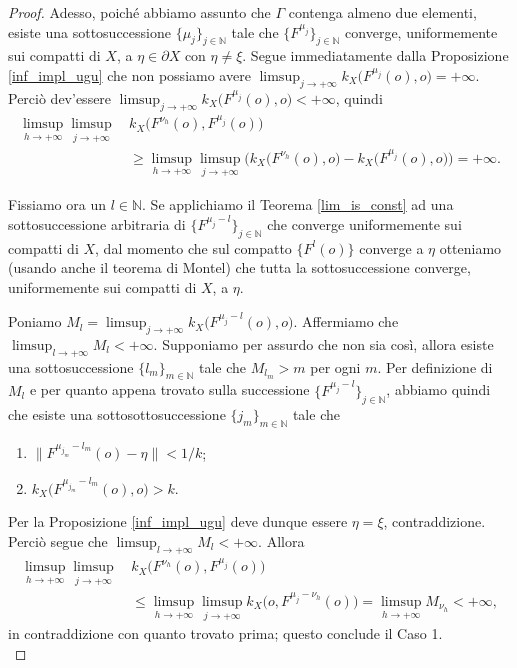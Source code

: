 \begin{proof}
    Adesso, poiché abbiamo assunto che $\Gamma$ contenga almeno due elementi, esiste una sottosuccessione $\{\mu_j\}_{j\in\mathbb{N}}$ tale che $\{F^{\mu_j}\}_{j\in\mathbb{N}}$ converge, uniformemente sui compatti di $X$, a $\eta\in\partial X$ con $\eta\not=\xi$. Segue immediatamente dalla Proposizione \ref{inf_impl_ugu} che non possiamo avere $\displaystyle\limsup_{j\longrightarrow+\infty} k_X\big(F^{\mu_j}(o),o\big)=+\infty$. Perciò dev'essere $\displaystyle\limsup_{j\longrightarrow+\infty} k_X\big(F^{\mu_j}(o),o\big)<+\infty$, quindi
    \begin{align*}
        \limsup_{h\longrightarrow+\infty}\limsup_{j\longrightarrow+\infty}\, &k_X\big(F^{\nu_h}(o),F^{\mu_j}(o)\big) \\
        &\ge \limsup_{h\longrightarrow+\infty}\limsup_{j\longrightarrow+\infty} \Big(k_X\big(F^{\nu_h}(o),o\big)-k_X\big(F^{\mu_j}(o),o\big)\Big)=+\infty.
    \end{align*}

    Fissiamo ora un $l\in\mathbb{N}$. Se applichiamo il Teorema \ref{lim_is_const} ad una sottosuccessione arbitraria di $\{F^{\mu_j-l}\}_{j\in\mathbb{N}}$ che converge uniformemente sui compatti di $X$, dal momento che sul compatto $\{F^l(o)\}$ converge a $\eta$ otteniamo (usando anche il teorema di Montel) che tutta la sottosuccessione converge, uniformemente sui compatti di $X$, a $\eta$.

    Poniamo $M_l=\displaystyle\limsup_{j\longrightarrow+\infty}k_X\big(F^{\mu_j-l}(o),o\big)$. Affermiamo che $\displaystyle\limsup_{l\longrightarrow+\infty}M_l<+\infty$. Supponiamo per assurdo che non sia così, allora esiste una sottosuccessione $\{l_m\}_{m\in\mathbb{N}}$ tale che $M_{l_m}>m$ per ogni $m$. Per definizione di $M_l$ e per quanto appena trovato sulla successione $\{F^{\mu_j-l}\}_{j\in\mathbb{N}}$, abbiamo quindi che esiste una sottosottosuccessione $\{j_m\}_{m\in\mathbb{N}}$ tale che
    \begin{enumerate}[label={(\arabic*)}]
        \item $\|F^{\mu_{j_m}-l_m}(o)-\eta\|<1/k$;
        \item $k_X\big(F^{\mu_{j_m}-l_m}(o),o\big)>k$.
    \end{enumerate}
    Per la Proposizione \ref{inf_impl_ugu} deve dunque essere $\eta=\xi$, contraddizione. Perciò segue che $\displaystyle\limsup_{l\longrightarrow+\infty}M_l<+\infty$. Allora
    \begin{align*}
        \limsup_{h\longrightarrow+\infty}\limsup_{j\longrightarrow+\infty}\, &k_X\big(F^{\nu_h}(o),F^{\mu_j}(o)\big) \\
        &\le \limsup_{h\longrightarrow+\infty}\limsup_{j\longrightarrow+\infty} k_X\big(o,F^{\mu_j-\nu_h}(o)\big)=\limsup_{h\longrightarrow+\infty}M_{\nu_h}<+\infty,
    \end{align*}
    in contraddizione con quanto trovato prima; questo conclude il Caso 1.\\


\end{proof}
